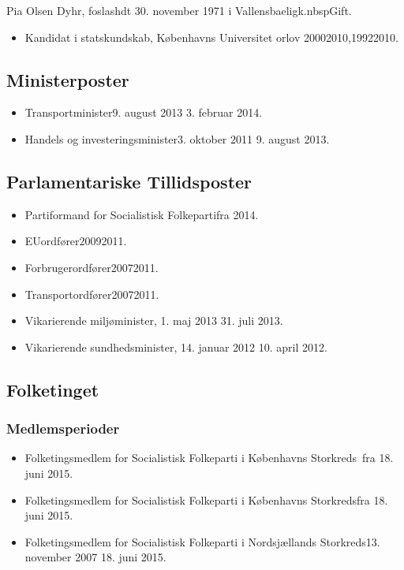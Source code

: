 \documentclass[11pt, a4paper]{awesome-cv}
\begin{document}
\makecvheader[R]
\makelettertitle
\begin{cvletter}
Pia Olsen Dyhr, foslashdt 30. november 1971 i Vallensbaeligk.nbspGift.

\begin{itemize}
\item Kandidat i statskundskab, Københavns Universitet orlov 20002010,19922010.
\end{itemize}
\subsection*{Ministerposter}
\begin{itemize}
\item Transportminister9. august 2013  3. februar 2014.
\item Handels og investeringsminister3. oktober 2011  9. august 2013.
\end{itemize}
\subsection*{Parlamentariske Tillidsposter}
\begin{itemize}
\item Partiformand for Socialistisk Folkepartifra 2014.
\item EUordfører20092011.
\item Forbrugerordfører20072011.
\item Transportordfører20072011.
\item Vikarierende miljøminister, 1. maj 2013    31. juli 2013.
\item Vikarierende sundhedsminister, 14. januar 2012   10. april 2012.
\end{itemize}
\subsection*{Folketinget}
\subsubsection*{Medlemsperioder}
\begin{itemize}
\item Folketingsmedlem for Socialistisk Folkeparti i Københavns Storkreds fra 18. juni 2015.
\item Folketingsmedlem for Socialistisk Folkeparti i Københavns Storkredsfra 18. juni 2015.
\item Folketingsmedlem for Socialistisk Folkeparti i Nordsjællands Storkreds13. november 2007  18. juni 2015.
\end{itemize}

\end{cvletter}
\end{document}
